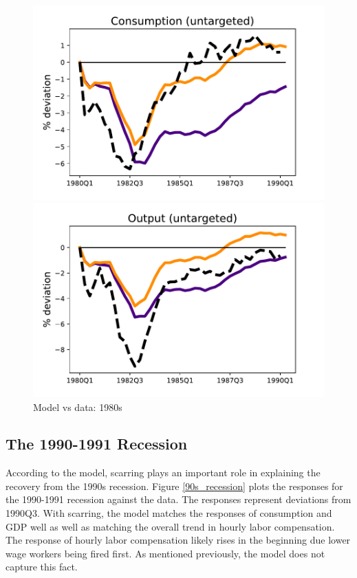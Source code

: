 \begin{figure}[H]
\medskip
\begin{minipage}{0.51\textwidth}
\includegraphics[scale=.57]{text/chapter1/Figures/80s/PCE_IPR_80s}
\end{minipage}\hspace*{\fill}
\begin{minipage}{0.51\textwidth}
\includegraphics[scale=.57]{text/chapter1/Figures/80s/GDP_IPR_80s}
\end{minipage}
\caption{Model vs data: 1980s}
\label{80s_recession}
\end{figure}





\subsection{The 1990-1991 Recession}

According to the model, scarring plays an important role in explaining the recovery from the 1990s recession. Figure \ref{90s_recession} plots the responses for the 1990-1991 recession against the data. The responses represent deviations from 1990Q3. With scarring, the model matches the responses of consumption and GDP well as well as matching the overall trend in hourly labor compensation. The response of hourly labor compensation likely rises in the beginning due lower wage workers being fired first. As mentioned previously, the model does not capture this fact.




